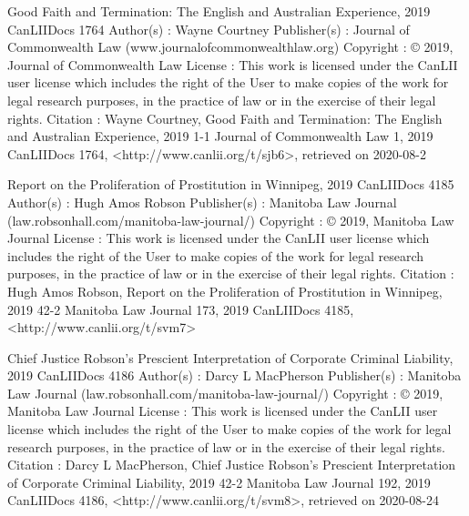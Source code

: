Good Faith and Termination: The English and Australian Experience, 2019 CanLIIDocs 1764
Author(s) : 	Wayne Courtney
Publisher(s) : 	Journal of Commonwealth Law (www.journalofcommonwealthlaw.org)
Copyright : 	© 2019, Journal of Commonwealth Law
License : 	This work is licensed under the CanLII user license which includes the right of the User to make copies of the work for legal research purposes, in the practice of law or in the exercise of their legal rights.
Citation : 	Wayne Courtney, Good Faith and Termination: The English and Australian Experience, 2019 1-1 Journal of Commonwealth Law 1, 2019 CanLIIDocs 1764, <http://www.canlii.org/t/sjb6>, retrieved on 2020-08-2




Report on the Proliferation of Prostitution in Winnipeg, 2019 CanLIIDocs 4185
Author(s) : 	Hugh Amos Robson
Publisher(s) : 	Manitoba Law Journal (law.robsonhall.com/manitoba-law-journal/)
Copyright : 	© 2019, Manitoba Law Journal
License : 	This work is licensed under the CanLII user license which includes the right of the User to make copies of the work for legal research purposes, in the practice of law or in the exercise of their legal rights.
Citation : 	Hugh Amos Robson, Report on the Proliferation of Prostitution in Winnipeg, 2019 42-2 Manitoba Law Journal 173, 2019 CanLIIDocs 4185, <http://www.canlii.org/t/svm7>

Chief Justice Robson’s Prescient Interpretation of Corporate Criminal Liability, 2019 CanLIIDocs 4186
Author(s) : 	Darcy L MacPherson
Publisher(s) : 	Manitoba Law Journal (law.robsonhall.com/manitoba-law-journal/)
Copyright : 	© 2019, Manitoba Law Journal
License : 	This work is licensed under the CanLII user license which includes the right of the User to make copies of the work for legal research purposes, in the practice of law or in the exercise of their legal rights.
Citation : 	Darcy L MacPherson, Chief Justice Robson’s Prescient Interpretation of Corporate Criminal Liability, 2019 42-2 Manitoba Law Journal 192, 2019 CanLIIDocs 4186, <http://www.canlii.org/t/svm8>, retrieved on 2020-08-24



